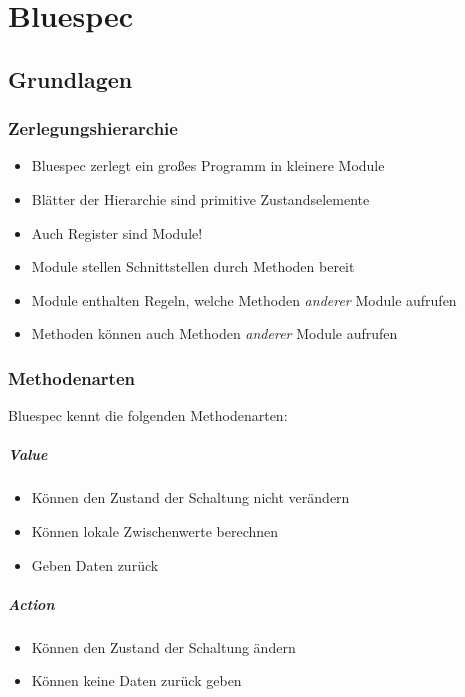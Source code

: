 \chapter{Bluespec}
	\section{Grundlagen}
		\subsection{Zerlegungshierarchie}
			\begin{itemize}
				\item Bluespec zerlegt ein großes Programm in kleinere Module
				\item Blätter der Hierarchie sind primitive Zustandselemente
				\item Auch Register sind Module!
				\item Module stellen Schnittstellen durch Methoden bereit
				\item Module enthalten Regeln, welche Methoden \textit{anderer} Module aufrufen
				\item Methoden können auch Methoden \textit{anderer} Module aufrufen
			\end{itemize}

		\subsection{Methodenarten}
			Bluespec kennt die folgenden Methodenarten:
			\paragraph{Value}
				\begin{itemize}
					\item Können den Zustand der Schaltung nicht verändern
					\item Können lokale Zwischenwerte berechnen
					\item Geben Daten zurück
				\end{itemize}

			\paragraph{Action}
				\begin{itemize}
					\item Können den Zustand der Schaltung ändern
					\item Können keine Daten zurück geben
				\end{itemize}

